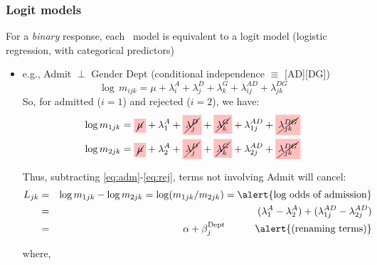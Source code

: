 \begin{frame}
\frametitle{Logit models}
For a \emph{binary} response, each \loglin\ model is equivalent to a logit
model (logistic regression, with categorical predictors)
  \begin{itemize}
	\item e.g., Admit $\perp$ Gender \given Dept (conditional independence $\equiv$ [AD][DG])
	\begin{equation*}
	  \log \,  m_{ijk}  =
	  \mu
	  +  \lambda_i^A
	  +  \lambda_j^D
	  +  \lambda_k^G
	  +  \lambda_{ij}^{AD}
	  +  \lambda_{jk}^{DG}
	\end{equation*}
    So, for admitted ($i=1$) and rejected ($i=2$), we have:
	\begin{eqnarray}
	  \log m_{1jk}  = \cancel{\mu} +  \lambda_1^A +  \cancel{\lambda_j^D} +  \cancel{\lambda_k^G} +  \lambda_{1j}^{AD} +  \cancel{\lambda_{jk}^{DG}}  \label{eq:adm}\\
	  \log m_{2jk}  = \cancel{\mu} +  \lambda_2^A +  \cancel{\lambda_j^D} +  \cancel{\lambda_k^G} +  \lambda_{2j}^{AD} +  \cancel{\lambda_{jk}^{DG}}  \label{eq:rej}
	\end{eqnarray}

    Thus, subtracting \eqref{eq:adm}-\eqref{eq:rej}, terms not involving Admit will cancel:
	\begin{eqnarray*}
	L_{jk} & = & \log m_{1jk} - \log m_{2jk} = \log (m_{1jk} / m_{2jk}) = \mbox{\alert{log odds of admission}} \\
	       & = & (\lambda_1^A - \lambda_2^A) + (\lambda_{1j}^{AD} - \lambda_{2j}^{AD}) \\
		   & = & \alpha   +  \beta _j^{\mbox{\scriptsize Dept}} \quad\quad\quad\mbox{\alert{(renaming terms)}}
	\end{eqnarray*}
	 

	   where,
  \end{itemize}
 \end{frame}

